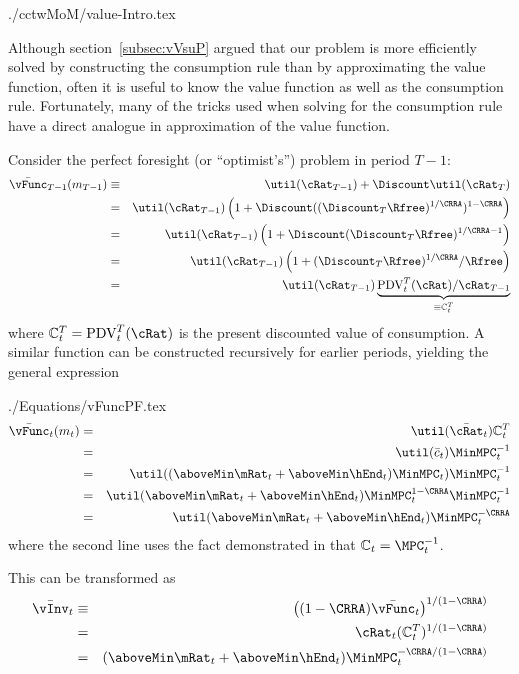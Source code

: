 \documentclass[titlepage]{\econtex}
\begin{document}
\begin{verbatimwrite}{./cctwMoM/value-Intro.tex}

  Although section~\ref{subsec:vVsuP} argued that our problem is more
  efficiently solved by constructing the consumption rule than by
  approximating the value function, often it is useful to know the
  value function as well as the consumption rule.  Fortunately, many
  of the tricks used when solving for the consumption rule have a 
  direct analogue in approximation of the value function.

  Consider the perfect foresight (or ``optimist's'') problem in period $T-1$:
  \begin{eqnarray*}
    \bar{\vFunc}_{T-1}({m}_{T-1}) & \equiv & \util(\cRat_{T-1})+\Discount \util(\cRat_{T})
    \\ & = & \util(\cRat_{T-1})\left(1+\Discount ((\Discount_{T}\Rfree)^{1/\CRRA})^{1-\CRRA}\right)
    \\ & = & \util(\cRat_{T-1})\left(1+\Discount (\Discount_{T}\Rfree)^{1/\CRRA-1}\right)
    \\ & = & \util(\cRat_{T-1})\left(1+(\Discount_{T}\Rfree)^{1/\CRRA}/\Rfree\right)
    \\ & = & \util(\cRat_{T-1})\underbrace{\mbox{PDV}_{t}^{T}(\cRat)/\cRat_{T-1}}_{\equiv \mathbb{C}_{t}^{T}}
  \end{eqnarray*}
  where $\mathbb{C}_{t}^{T}=\mbox{PDV}_{t}^{T}(\cRat)$ is the present discounted value of consumption.
  A similar function can be constructed recursively for earlier periods, yielding
  the general expression \hypertarget{vFuncPF}{}
\end{verbatimwrite}

\begin{verbatimwrite}{./Equations/vFuncPF.tex}
  \begin{eqnarray}
    \bar{\vFunc}_{t}({m}_{t}) & = & \util(\bar{\cRat}_{t})\mathbb{C}_{t}^{T}\label{eq:vFuncPF}
    \\ & = & \util(\bar{c}_{t}) \MinMPC_{t}^{-1} %
    \\ & = & \util((\aboveMin \mRat_{t}+\aboveMin \hEnd_{t})\MinMPC_{t}) \MinMPC_{t}^{-1} %
    \\ & = & \util(\aboveMin \mRat_{t}+\aboveMin \hEnd_{t})\MinMPC_{t}^{1-\CRRA} \MinMPC_{t}^{-1} %
    \\ & = & \util(\aboveMin \mRat_{t}+\aboveMin \hEnd_{t})\MinMPC_{t}^{-\CRRA}  %
  \end{eqnarray}
  where the second line uses the fact demonstrated in \cite{BufferStockTheory} that $\mathbb{C}_{t}=\MPC^{-1}_{t}$. %

  This can be transformed as
  \begin{eqnarray*}
    \bar{\vInv}_{t} & \equiv & \left((1-\CRRA)\bar{\vFunc}_{t}\right)^{1/(1-\CRRA)}
    \\ & = & \cRat_{t}(\mathbb{C}_{t}^{T})^{1/(1-\CRRA)}
    \\ & = & (\aboveMin \mRat_{t}+\aboveMin \hEnd_{t})\MinMPC_{t}^{-\CRRA/(1-\CRRA)}   %
  \end{eqnarray*}
\end{verbatimwrite}
\end{document}

